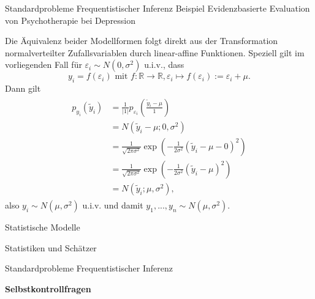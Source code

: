 \documentclass[
  8pt,
  ignorenonframetext,
]{beamer}
\begin{document}
\begin{frame}[t]{Standardprobleme Frequentistischer Inferenz}
\protect\hypertarget{standardprobleme-frequentistischer-inferenz-6}{}
Beispiel \textbar{} Evidenzbasierte Evaluation von Psychotherapie bei
Depression

\vfill
\footnotesize

Die Äquivalenz beider Modellformen folgt direkt aus der Transformation
normalverteilter Zufallsvariablen durch linear-affine Funktionen.
Speziell gilt im vorliegenden Fall für
\(\varepsilon_i \sim N(0,\sigma^2)\) u.i.v., dass \begin{equation}
y_i = f(\varepsilon_i)
\mbox{ mit }
f : \mathbb{R} \to \mathbb{R}, \varepsilon_i \mapsto f(\varepsilon_i) := \varepsilon_i + \mu.
\end{equation} Dann gilt \begin{align}
\begin{split}
p_{y_i}(\tilde{y}_i)
& = \frac{1}{|1|} p_{\varepsilon_i}\left(\frac{\tilde{y}_i - \mu}{1} \right)                        \\
& = N\left(\tilde{y}_i - \mu; 0, \sigma^2\right)                                                    \\
& = \frac{1}{\sqrt{2\pi\sigma^2}}\exp\left(-\frac{1}{2\sigma^2}(\tilde{y}_i - \mu - 0)^2 \right)    \\
& = \frac{1}{\sqrt{2\pi\sigma^2}}\exp\left(-\frac{1}{2\sigma^2}(\tilde{y}_i - \mu)^2 \right)        \\
& = N(\tilde{y}_i; \mu,\sigma^2),
\end{split}
\end{align} also \(y_i \sim N(\mu,\sigma^2)\) u.i.v. und damit
\(y_1,...,y_n\sim N(\mu,\sigma^2)\). \vfill
\end{frame}

\begin{frame}{}
\protect\hypertarget{section-8}{}
\large
{}
\vfill

Statistische Modelle

Statistiken und Schätzer

Standardprobleme Frequentistischer Inferenz

\textbf{Selbstkontrollfragen} \vfill
\end{frame}
\end{document}
